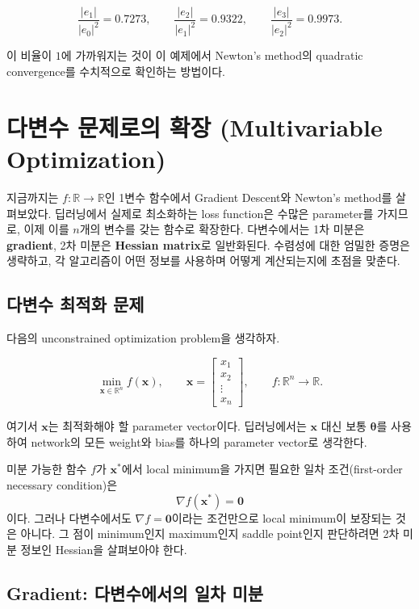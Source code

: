\documentclass[11pt,a4paper]{article}
\begin{document}
\[
\frac{|e_1|}{|e_0|^2}=0.7273,
\qquad
\frac{|e_2|}{|e_1|^2}=0.9322,
\qquad
\frac{|e_3|}{|e_2|^2}=0.9973.
\]

이 비율이 $1$에 가까워지는 것이 이 예제에서
Newton's method의 quadratic convergence를 수치적으로 확인하는 방법이다.

\section{다변수 문제로의 확장 (Multivariable Optimization)}

지금까지는 $f:\mathbb{R}\to\mathbb{R}$인 1변수 함수에서 Gradient Descent와
Newton's method를 살펴보았다. 딥러닝에서 실제로 최소화하는 loss function은
수많은 parameter를 가지므로, 이제 이를 $n$개의 변수를 갖는 함수로 확장한다.
다변수에서는 1차 미분은 \textbf{gradient}, 2차 미분은
\textbf{Hessian matrix}로 일반화된다. 수렴성에 대한 엄밀한 증명은 생략하고,
각 알고리즘이 어떤 정보를 사용하며 어떻게 계산되는지에 초점을 맞춘다.

\subsection{다변수 최적화 문제}

다음의 unconstrained optimization problem을 생각하자.

\[
    \min_{\mathbf{x}\in\mathbb{R}^n} f(\mathbf{x}),
    \qquad
    \mathbf{x}
    =
    \begin{bmatrix}
    x_1\\
    x_2\\
    \vdots\\
    x_n
    \end{bmatrix},
    \qquad
    f:\mathbb{R}^n\to\mathbb{R}.
\]

여기서 $\mathbf{x}$는 최적화해야 할 parameter vector이다.
딥러닝에서는 $\mathbf{x}$ 대신 보통 $\boldsymbol{\theta}$를 사용하여
network의 모든 weight와 bias를 하나의 parameter vector로 생각한다.

미분 가능한 함수 $f$가 $\mathbf{x}^*$에서 local minimum을 가지면
필요한 일차 조건(first-order necessary condition)은
\[
    \nabla f(\mathbf{x}^*)=\mathbf{0}
\]
이다. 그러나 다변수에서도 $\nabla f=\mathbf{0}$이라는 조건만으로
local minimum이 보장되는 것은 아니다. 그 점이 minimum인지 maximum인지
saddle point인지 판단하려면 2차 미분 정보인 Hessian을 살펴보아야 한다.

\subsection{Gradient: 다변수에서의 일차 미분}
\end{document}
